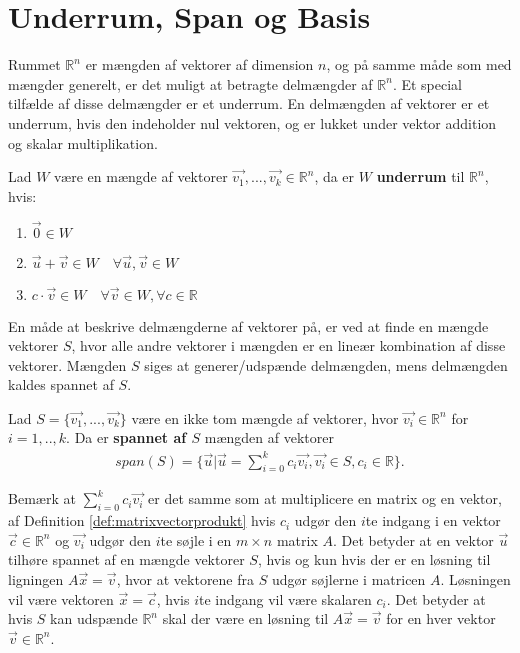 \section{Underrum, Span og Basis}
Rummet $\mathds{R}^n$ er mængden af vektorer af dimension $n$, og på samme måde som med mængder generelt, er det muligt at betragte delmængder af $\mathds{R}^n$.
Et special tilfælde af disse delmængder er et underrum.
En delmængden af vektorer  er et underrum, hvis den indeholder nul vektoren, og er lukket under vektor addition og skalar multiplikation. 
\begin{defn}[Underrum]
Lad $W$ være en mængde af vektorer $\vec{v_1},...,\vec{v_k} \in \mathds{R}^n$, da er $W$  \textbf{underrum} til $\mathds{R}^n$, hvis:
\begin{enumerate}[label=\alph*]
\item $\vec{0} \in W$
\item $\vec{u}+\vec{v} \in W \quad \forall \vec{u}, \vec{v} \in W$
\item $c \cdot \vec{v} \in W \quad \forall \vec{v} \in W, \forall c \in \mathds{R}$
\end{enumerate}
\label{def:underrum}
\end{defn}
En måde at beskrive delmængderne af vektorer på, er ved at finde en mængde vektorer $S$, hvor alle andre vektorer i mængden er en lineær kombination af disse vektorer. 
Mængden $S$ siges at generer/udspænde delmængden, mens delmængden kaldes spannet af $S$.
\begin{defn}[Span]
Lad $S=\{\vec{v_1},...,\vec{v_k}\}$ være en ikke tom mængde af vektorer, hvor $\vec{v_i} \in \mathds{R}^n$ for $i = 1,..,k$. 
Da er \textbf{spannet af $S$} mængden af vektorer
\begin{align*}
span(S) = \{\vec{u}| \vec{u}=\sum_{i=0}^k c_i \vec{v_i}, \vec{v_i} \in S, c_i \in \mathds{R}\}.
\end{align*} 
\label{def:span}
\end{defn}
Bemærk at $\sum_{i=0}^k c_i \vec{v_i}$ er det samme som at multiplicere en matrix og en vektor, af Definition \ref{def:matrixvectorprodukt} hvis $c_i$ udgør den $i$te indgang i en vektor $\vec{c} \in \mathds{R}^n$ og $\vec{v_i}$ udgør den $i$te søjle i en $m \times n$ matrix $A$.
Det betyder at en vektor $\vec{u}$ tilhøre spannet af en mængde vektorer $S$, hvis og kun hvis der er en løsning til ligningen $A\vec{x} = \vec{v}$, hvor at vektorene fra $S$ udgør søjlerne i matricen $A$.
Løsningen vil være vektoren $\vec{x}=\vec{c}$, hvis $i$te indgang vil være skalaren $c_i$.
Det betyder at hvis $S$ kan udspænde $\mathds{R}^n$ skal der være en løsning til $A \vec{x} = \vec{v}$ for en hver vektor $\vec{v} \in \mathds{R}^n$. 
